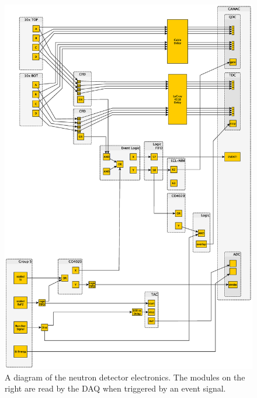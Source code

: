 \begin{figure}[htp]
\centering
\includegraphics[height=0.8\textheight]{figures/electronics.eps}
\caption[Full diagram of the detector electronics.]{A diagram of the neutron detector electronics.  The modules on the right are read by the DAQ when triggered by an event signal.}
\label{fig:fullElectronics}
\end{figure}

